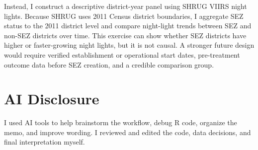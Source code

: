 \documentclass[10.5pt]{article}
\begin{document}
Instead, I construct a descriptive district-year panel using SHRUG VIIRS night lights. Because SHRUG uses 2011 Census district boundaries, I aggregate SEZ status to the 2011 district level and compare night-light trends between SEZ and non-SEZ districts over time. This exercise can show whether SEZ districts have higher or faster-growing night lights, but it is not causal. A stronger future design would require verified establishment or operational start dates, pre-treatment outcome data before SEZ creation, and a credible comparison group.

\section*{AI Disclosure}

I used AI tools to help brainstorm the workflow, debug R code, organize the memo, and improve wording. I reviewed and edited the code, data decisions, and final interpretation myself.
\end{document}
